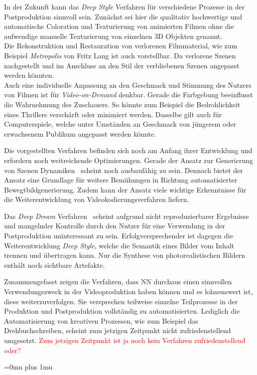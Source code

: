 \documentclass[times, 11pt,twocolumn]{article}
\begin{document}
In der Zukunft kann das \textit{Deep Style} Verfahren für verschiedene Prozesse in der Postproduktion sinnvoll sein. Zunächst sei hier die qualitativ hochwertige und automatische Coloration und Texturierung von animierten Filmen ohne die aufwendige manuelle Texturierung von einzelnen 3D Objekten genannt. \\
Die Rekonstruktion und Restauration von verlorenen Filmmaterial, wie zum Beispiel \textit{Metropolis} von Fritz Lang ist auch vorstellbar. Da verlorene Szenen nachgestellt und im Anschluss an den Stil der verbliebenen Szenen angepasst werden könnten.\\
Auch eine individuelle Anpassung an den Geschmack und Stimmung des Nutzers von Filmen ist für \textit{Video-on-Demand} denkbar. Gerade die Farbgebung beeinflusst die Wahrnehmung des Zuschauers. So könnte zum Beispiel die Bedrohlichkeit eines Thrillers verschärft oder minimiert werden. Dasselbe gilt auch für Computerspiele, welche unter Umständen an Geschmack von jüngerem oder erwachsenem Publikum angepasst werden könnte.

 \label{Fazit}
Die vorgestellten Verfahren befinden sich noch am Anfang ihrer Entwicklung und erfordern noch weitreichende Optimierungen. Gerade der Ansatz zur Generierung von Szenen Dynamiken~\cite{VondrickPT16} scheint noch ausbaufähig zu sein. Dennoch bietet der Ansatz eine Grundlage für weitere Bemühungen in Richtung automatisierter Bewegtbildgenerierung. Zudem kann der Ansatz viele wichtige Erkenntnisse für die Weiterentwicklung von Videokodierungsverfahren liefern.

Das \textit{Deep Dream} Verfahren~\cite{DeepDream} scheint aufgrund nicht reproduzierbarer Ergebnisse und mangelnder Kontrolle durch den Nutzer für eine Verwendung in der Postproduktion uninteressant zu sein. Erfolgversprechender ist dagegen die Weiterentwicklung \textit{Deep Style}, welche die Semantik eines Bilder vom Inhalt trennen und übertragen kann. Nur die Synthese von photorealistischen Bildern enthält noch sichtbare Artefakte.

Zusammengefasst zeigen die Verfahren, dass NN durchaus einen sinnvollen Verwendungszweck in der Videoproduktion haben können und es lohnenswert ist, diese weiterzuverfolgen. Sie versprechen teilweise einzelne Teilprozesse in der Produktion und Postproduktion vollständig zu automatisierten. Lediglich die Automatisierung von kreativen Prozessen, wie zum Beispiel das Drehbuchschreiben, scheint zum jetzigen Zeitpunkt nicht zufriedenstellend umgesetzt. \textcolor{red}{Zum jetzigen Zeitpunkt ist ja noch kein Verfahren zufriedenstellend oder?}


\newpage
\Urlmuskip=0mu plus 1mu\relax %
 

\end{document}
